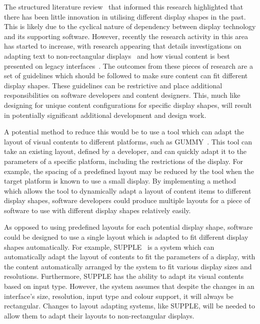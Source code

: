 \documentclass{bmcart}
\begin{document}
The structured literature review~\cite{Kitchenham2004} that informed this research highlighted that there has been little innovation in utilising different display shapes in the past.
This is likely due to the cyclical nature of dependency between display technology and its supporting software.
However, recently the research activity in this area has started to increase, with research appearing that details investigations on adapting text to non-rectangular displays~\cite{Serrano2016} and how visual content is best presented on legacy interfaces~\cite{Serrano2017}.
The outcomes from these pieces of research are a set of guidelines which should be followed to make sure content can fit different display shapes.
These guidelines can be restrictive and  place additional responsibilities on software developers and content designers.
This, much like designing for unique content configurations for specific display shapes, will result in potentially significant additional development and design work.

A potential method to reduce this would be to use a tool which can adapt the layout of visual contents to different platforms, such as GUMMY~\cite{Meskens2008}.
This tool can take an existing layout, defined by a developer, and can quickly adapt it to the parameters of a specific platform, including the restrictions of the display.
For example, the spacing of a predefined layout may be reduced by the tool when the target platform is known to use a small display.
By implementing a method which allows the tool to dynamically adapt a layout of content items to different display shapes, software developers could produce multiple layouts for a piece of software to use with different display shapes relatively easily.

As opposed to using predefined layouts for each potential display shape, software could be designed to use a single layout which is adapted to fit different display shapes automatically.
For example, SUPPLE~\cite{Gajos2004} is a system which can
automatically adapt the layout of contents to fit the parameters of a display, with the content automatically arranged by the system to fit various display sizes and resolutions.
Furthermore, SUPPLE has the ability to adapt its visual contents based on input type.
However, the system assumes that despite the changes in an interface's size, resolution, input type and colour support, it will always be rectangular.
Changes to layout adapting systems, like SUPPLE, will be needed to allow them to adapt their layouts to non-rectangular displays.
\end{document}
